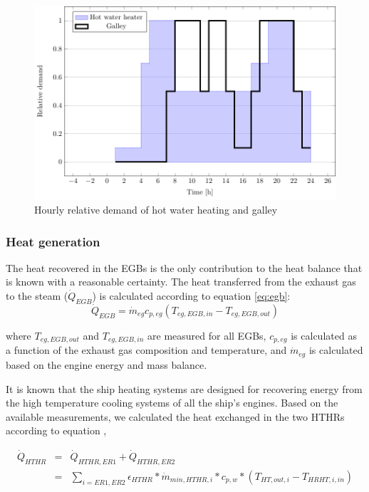 \documentclass[preprint,12pt]{elsarticle}
\begin{document}
\begin{figure}[tbp!]
	\centering
	\includegraphics[width=0.7\linewidth]{Figures/galleyHotWater.pdf}
	\caption{Hourly relative demand of hot water heating and galley}
	\label{fig:galleyhotwater}
\end{figure}

	
	
\subsubsection{Heat generation}
	
The heat recovered in the EGBs is the only contribution to the heat balance that is known with a reasonable certainty. The heat transferred from the exhaust gas to the steam ($\dot{Q}_{EGB}$) is calculated according to equation \ref{eq:egb}:
\begin{equation}
\dot{Q}_{EGB} = \dot{m}_{eg} c_{p,eg} (T_{eg,EGB,in} - T_{eg,EGB,out})
\end{equation}\label{eq:egb}

where $T_{eg,EGB,out}$ and $T_{eg,EGB,in}$ are measured for all EGBs, $c_{p,eg}$ is calculated as a function of the exhaust gas composition and temperature, and $ \dot{m}_{eg} $ is calculated based on the engine energy and mass balance.

It is known that the ship heating systems are designed for recovering energy from the high temperature cooling systems of all the ship's engines. Based on the available measurements, we calculated the heat exchanged in the two HTHRs according to equation \label{eqn:HTHR2},

\begin{eqnarray}
\dot{Q}_{HTHR} & = & \dot{Q}_{HTHR,ER1} + \dot{Q}_{HTHR,ER2} \label{eqn:HTHR1} \\
& = & \sum_{i=ER1,ER2}{\epsilon_{HTHR} * \dot{m}_{min,HTHR,i} * c_{p,w} * (T_{HT,out,i} - T_{HRHT,i,in})} \label{eqn:HTHR2}
\end{eqnarray}
\end{document}
